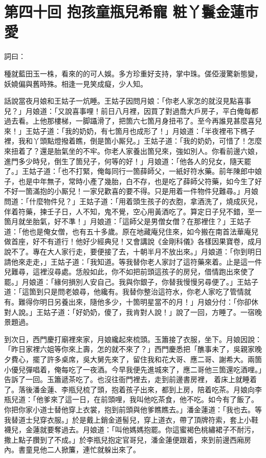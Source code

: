 
\chapter*{第四十回 抱孩童瓶兒希寵 粧丫鬟金蓮市愛}


詞曰：

\begin{myquote}
種就藍田玉一株，看來的的可人娛。多方珍重好支持，掌中珠。傞俹漫驚新態變，妖嬈偏與舊時殊。相逢一見笑成癡，少人知。

\end{myquote}

話說當夜月娘和王姑子一炕睡。王姑子因問月娘：「你老人家怎的就沒見點喜事兒？」月娘道：「又說喜事哩！前日八月裡，因買了對過喬大戶房子，平白俺每都過去看。上他那樓梯，一脚躡滑了，把箇六七箇月身扭弔了。至今再誰見甚麼喜兒來！」王姑子道：「我的奶奶，有七箇月也成形了！」月娘道：「半夜裡弔下榪子裡，我和丫頭點燈撥着瞧，倒是箇小厮兒。」王姑子道：「我的奶奶，可惜了！怎麼來扭着了？還是胎氣坐的不牢。{}你老人家養出箇兒來，強如別人。你看前邊六娘，進門多少時兒，倒生了箇兒子，何等的好！」月娘道：「他各人的兒女，隨天罷了。」王姑子道：「也不打緊，俺每同行一箇薛師父，一紙好符水藥。前年陳郎中娘子，也是中年無子，常時小產了幾胎，白不存，也是吃了薛師父符藥，如今生了好不好一箇滿抱的小厮兒！一家兒歡喜的要不得。只是用着一件物件兒難尋。」月娘問道：「什麼物件兒？」王姑子道：「用着頭生孩子的衣胞，拿酒洗了，燒成灰兒，伴着符藥，揀壬子日，人不知，鬼不覺，空心用黃酒吃了。算定日子兒不錯，至一箇月就坐胎氣，好不準！」月娘道：「這師父是男僧女僧？在那裡住？」王姑子道：「他也是俺女僧，也有五十多歲。原在地藏庵兒住來，如今搬在南首法華庵兒做首座，好不有道行！他好少經典兒！又會講說《金剛科儀》各樣因果寶卷，成月說不了。專在大人家行走，要便接了去，十朝半月不放出來。」月娘道：「你到明日請他來走走，」王姑子道：「我知道。等我替你老人家討了這符藥來着。止是這一件兒難尋，這裡沒尋處。恁般如此，你不如把前頭這孩子的房兒，借情跑出來使了罷。」月娘道：「緣何損別人安自己。我與你銀子，你替我慢慢另尋便了。」王姑子道：「這箇到只是問老娘尋，他纔有。我替你整治這符水，你老人家吃了管情就有。難得你明日另養出來，隨他多少，十箇明星當不的月！」月娘分付：「你卻休對人說。」王姑子道：「好奶奶，傻了，我肯對人說！」說了一回，方睡了。一宿晚景題過。

到次日，西門慶打廟裡來家，月娘纔起來梳頭。玉簫接了衣服，坐下。月娘因說：「昨日家裡六姐等你來上壽，怎的就不來了？」西門慶悉把「醮事未了，吳親家晚夕費心，擺了許多桌席，吳大舅先來了，留住我和花大哥、應二哥、謝希大。兩箇小優兒彈唱着，俺每吃了一夜酒。今早我便先進城來了，應二哥他三箇還吃酒哩。」告訴了一回。玉簫遞茶吃了。也沒往衙門裡去，走到前邊書房裡，𢱉着床上就睡着了。落後潘金蓮、李瓶兒梳了頭，抱着孩子出來，都到上房，陪着吃茶。月娘向李瓶兒道：「他爹來了這一日，在前頭哩，我叫他吃茶食，他不吃。如今有了飯了。你把你家小道士替他穿上衣裳，抱到前頭與他爹瞧瞧去。」潘金蓮道：「我也去。等我替道士兒穿衣服。」{}於是戴上銷金道髻兒，穿上道衣，帶了頂牌符索，套上小鞋襪兒，金蓮就要奪過去。月娘道：「叫他媽媽抱罷。你這蜜褐色桃繡裙子不耐污，撒上點子臢到了不成。」於李瓶兒抱定官哥兒，潘金蓮便跟着，來到前邊西廂房內。書童見他二人掀簾，連忙就躲出來了。

